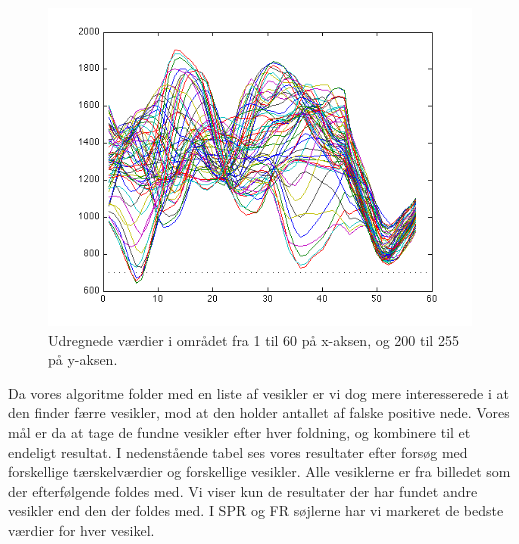 \begin{figure}[H]
		\centering
		\includegraphics[scale=0.9]{files/postmethod/img/conv_lines_2.png}
	\caption{Udregnede værdier i området fra 1 til 60 på x-aksen, og 200 til 255 på y-aksen. \label{fig:postmethod_conv_lines_2}}
\end{figure}

Da vores algoritme folder med en liste af vesikler er vi dog mere interesserede i at den finder færre vesikler, mod at den holder antallet af falske positive nede. Vores mål er da at tage de fundne vesikler efter hver foldning, og kombinere til et endeligt resultat. I nedenstående tabel ses vores resultater efter forsøg med forskellige tærskelværdier og forskellige  vesikler. Alle vesiklerne er fra billedet som der efterfølgende foldes med. Vi viser kun de resultater der har fundet andre vesikler end den der foldes med. I SPR og FR søjlerne har vi markeret de bedste værdier for hver vesikel.

